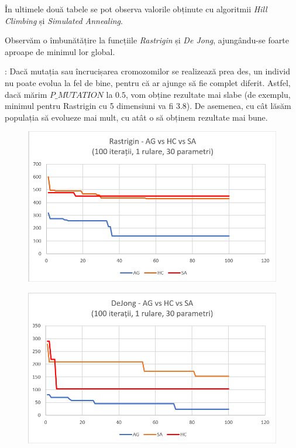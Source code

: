 \documentclass[paper=a4, fontsize=11pt]{scrartcl}
\begin{document}
În ultimele două tabele se pot observa valorile obținute cu algoritmii \textit{Hill Climbing} și \textit{Simulated Annealing}.

Observăm o îmbunătățire la funcțiile \textit{Rastrigin} și \textit{De Jong}, ajungându-se foarte aproape de minimul lor global.

\underline{}: Dacă mutația sau încrucișarea cromozomilor se realizează prea des, un individ nu poate evolua la fel de bine,
pentru că ar ajunge să fie complet diferit. Astfel, dacă mărim $P\_MUTATION$ la $0.5$, vom obține rezultate mai slabe (de exemplu, minimul pentru Rastrigin cu 5 dimensiuni
va fi $3.8$).
De asemenea, cu cât lăsăm populația să evolueze mai mult, cu atât o să obținem rezultate mai bune.

\begin{figure}[h!]
    \includegraphics[scale=0.9]{GraficRastrigin.png}
\end{figure}

\begin{figure}[h]
    \includegraphics[scale=0.9]{GraficDeJong.png}
\end{figure}
\end{document}
